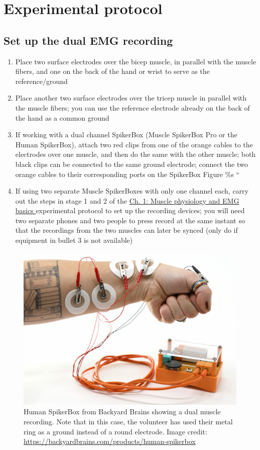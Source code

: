 \documentclass{article}
\begin{document}
\section{Experimental protocol}

\subsection{Set up the dual EMG recording}

\begin{enumerate}
\item Place two surface electrodes over the bicep muscle, in parallel with the muscle fibers, and one on the back of the hand or wrist to serve as the reference/ground
\item Place another two surface electrodes over the tricep muscle in parallel with the muscle fibers; you can use the reference electrode already on the back of the hand as a common ground
\item If working with a dual channel SpikerBox (Muscle SpikerBox Pro or the Human SpikerBox), attach two red clips from one of the orange cables to the electrodes over one muscle, and then do the same with the other muscle; both black clips can be connected to the same ground electrode; connect the two orange cables to their corresponding ports on the SpikerBox \citep{}Figure \%s ``
\item If using two separate Muscle SpikerBoxes with only one channel each, carry out the steps in stage 1 and 2 of the \href{https://curvenote.com/oxa:EPpXta8zJdzN048lz8AR/hZTnTYzQR5EQmCKX51Wj}{Ch. 1: Muscle physiology and EMG basics }experimental protocol to set up the recording devices; you will need two separate phones and two people to press record at the same instant so that the recordings from the two muscles can later be synced (only do if equipment in bullet 3 is not available)
\end{enumerate}

\begin{figure}[!htbp]
\centering
\includegraphics[width=0.7\linewidth]{files/EPpXta8zJdzN048lz8AR-fc83ca701ef50e48111b5eca101c05b6.png}
\caption[]{Human SpikerBox from Backyard Brains showing a dual muscle recording. Note that in this case, the volunteer has used their metal ring as a ground instead of a round electrode. Image credit: \href{https://backyardbrains.com/products/human-spikerbox}{https://backyardbrains.com/products/human-spikerbox}}
\label{oI7Gxpn4ek}
\end{figure}
\end{document}

